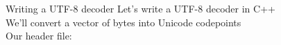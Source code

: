 \documentclass[../index.tex]{subfiles}
\begin{document}
\renewcommand{\currenttitle}{Writing a UTF-8 decoder}
\newcommand{\decoderheaderlisting}[2]{%
}
\begin{frame}{\currenttitle}
%
%
%
%
%
%
  Let's write a UTF-8 decoder in C++ \\

  We'll convert a vector of bytes into Unicode codepoints \\[2em]

  Our header file: \\[1em]

  \decoderheaderlisting{4}{7}
\end{frame}
\end{document}
